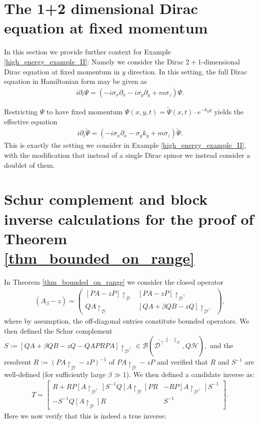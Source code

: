 \documentclass[reqno,12pt,letterpaper]{amsart}
\numberwithin{equation}{section}
\newcommand{\1}{\mathds{1}}
\theoremstyle{definition}
\begin{document}
\section{The 1+2 dimensional Dirac equation at fixed momentum}\label{fixed_momentum_de}
In this section we provide further context for Example \ref{high_energy_example_II}: Namely we consider the Dirac $2+1$-dimensional Dirac equation at fixed momentum in $y$ direction. In this setting, the full  Dirac equation in Hamiltonian form may be given as \cite{Thaller1992, Koke2020} 
\begin{align}
i \partial_t \Psi =  
		\left(
		- i \sigma_x \partial_x  - i \sigma_y \partial_y + m \sigma_z
		\right) \Psi.
\end{align}	

Restricting $\Psi$ to have fixed momentum $\Psi(x,y,t) = \tilde{\Psi}(x,t) \cdot e^{-k_y y}$ yields the effective equation
\begin{align}
	i \partial_t \tilde{\Psi} =  
	\left(
	- i \sigma_x \partial_x  -  \sigma_y k_y + m \sigma_z
	\right) \tilde{\Psi}.
\end{align}		
This is exactly the setting we consider in Example \ref{high_energy_example_II}, with the modification that instead of a single Dirac spinor we instead consider a doublet of them. 


\section{Schur complement and block inverse calculations for the proof of Theorem \ref{thm_bounded_on_range}}\label{proof_support}
In Theorem \ref{thm_bounded_on_range} we consider the closed operator
	\begin{align}
	(A_\beta  - z)
	=
	\begin{pmatrix}
		[PA - zP]\restriction_{\mathcal{D}} & [PA - zP]\restriction_{\mathcal{D}^\intercal}   \\
		QA\restriction_{\mathcal{D}}    & [QA + \beta QB - zQ]\restriction_{\mathcal{D}^\intercal}
	\end{pmatrix},
\end{align}
where by assumption, the off-diagonal entries constitute bounded operators. 
We then defined the Schur complement	$ 	S := [QA + \beta QB - zQ - QAP R PA]\restriction_{\mathcal{D}^\intercal}  \in \mathcal{B}(\overline{\mathcal{D}^\intercal}^{\| \cdot \|_{\mathcal{H}}}, Q  \mathcal{H}),
$
and the resolvent 	$
R := (PA\restriction_{\mathcal{D}} - zP)^{-1} $ of $PA\restriction_{\mathcal{D}} - zP$ and verified that $R$ and $S^{-1}$ are well-defined (for sufficiently large $\beta \gg 1$).  We then defined a candidate inverse as:
\begin{align}
	T =
	\begin{bmatrix}
		R + R P[A\restriction_{\mathcal{D}^{\intercal}}] S^{-1} Q[A\restriction_{\mathcal{D}}]P R & -R P[A\restriction_{\mathcal{D}^{\intercal}}]S^{-1} \\
		- S^{-1} Q[A\restriction_{\mathcal{D}}] R & S^{-1}
	\end{bmatrix}.
\end{align}
Here we now verify that this is indeed a true inverse:
	
\end{document}
